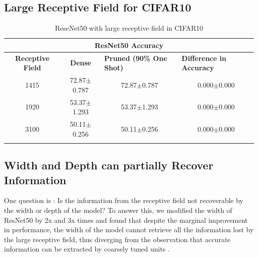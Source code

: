 \subsection{Large Receptive Field for CIFAR10}
\label{subsec:LargeRFCF10}

\begin{table}[H]
  \centering
\begin{tabular}{@{}cccc@{}}
\toprule
\multicolumn{4}{c}{\textbf{ResNet50 Accuracy}}                                                                                         \\ \midrule
\textbf{Receptive Field} & \textbf{Dense}  & \multicolumn{1}{l}{\textbf{Pruned (90\% One Shot)}} & \multicolumn{1}{l}{\textbf{Difference in Accuracy}} \\ \midrule
1415                     & 72.87$\pm$0.787 & 72.87$\pm$0.787                     & 0.000$\pm$0.000                                     \\
1920                     & 53.37$\pm$1.293 & 53.37$\pm$1.293                     & 0.000$\pm$0.000                                     \\
3100                     & 50.11$\pm$0.256 & 50.11$\pm$0.256                     & 0.000$\pm$0.000
\\ \bottomrule \\
\end{tabular}
\caption{ReseNet50 with large receptive field in CIFAR10}
\label{tab:cifar10  largeRF one shot pruning rate 09}
\end{table}



\subsection{Width and Depth can partially Recover Information}

One question is : Is the information from the receptive field not recoverable by the width or depth of the model? To
answer this, we modified the width of ResNet50 by 2x and 3x times and found that despite the marginal improvement in performance, the width
of the model cannot retrieve all the information lost by the large receptive field, thus diverging from the observation that
accurate information can be extracted by coarsely tuned units \citep{ballardParallelVisualComputation1983}.


